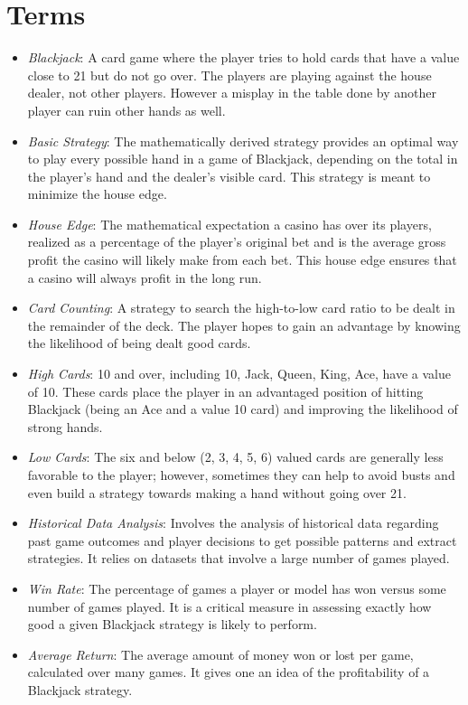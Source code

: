 \documentclass[a4paper,12pt]{report}
\begin{document}
\section{Terms}
\begin{itemize}  
\item \textit{Blackjack}: A card game where the player tries to hold cards that have a value close to 21 but do not go over. The players are playing against the house dealer, not other players. However a misplay in the table done by another player can ruin other hands as well.

\item \textit{Basic Strategy}: The mathematically derived strategy provides an optimal way to play every possible hand in a game of Blackjack, depending on the total in the player's hand and the dealer's visible card. This strategy is meant to minimize the house edge.

\item \textit{House Edge}: The mathematical expectation a casino has over its players, realized as a percentage of the player's original bet and is the average gross profit the casino will likely make from each bet. This house edge ensures that a casino will always profit in the long run.

\item \textit{Card Counting}: A strategy to search the high-to-low card ratio to be dealt in the remainder of the deck. The player hopes to gain an advantage by knowing the likelihood of being dealt good cards.

\item \textit{High Cards}: 10 and over, including 10, Jack, Queen, King, Ace, have a value of 10. These cards place the player in an advantaged position of hitting Blackjack (being an Ace and a value 10 card) and improving the likelihood of strong hands.

\item \textit{Low Cards}: The six and below (2, 3, 4, 5, 6) valued cards are generally less favorable to the player; however, sometimes they can help to avoid busts and even build a strategy towards making a hand without going over 21.

\item \textit{Historical Data Analysis}: Involves the analysis of historical data regarding past game outcomes and player decisions to get possible patterns and extract strategies. It relies on datasets that involve a large number of games played.

\item \textit{Win Rate}: The percentage of games a player or model has won versus some number of games played. It is a critical measure in assessing exactly how good a given Blackjack strategy is likely to perform.

\item \textit{Average Return}: The average amount of money won or lost per game, calculated over many games. It gives one an idea of the profitability of a Blackjack strategy.
\end{itemize}
\end{document}
